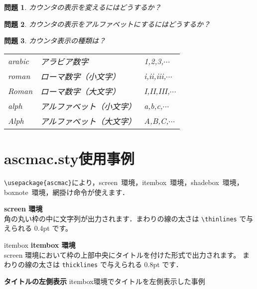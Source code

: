 \documentclass[a4paper,10pt]{jsarticle}
\begin{document}
\newtheorem{MONDAI}{問題}
\renewcommand{\theMONDAI}{\alph{MONDAI}}
\begin{MONDAI}
カウンタの表示を変えるにはどうするか？
\end{MONDAI}
\begin{MONDAI}
カウンタの表示をアルファベットにするにはどうするか？
\end{MONDAI}
\begin{MONDAI}
カウンタ表示の種類は？
\begin{center}
\begin{tabular}{lll}\hline
arabic & アラビア数字            & 1,2,3,$\cdots$    \\
roman  & ローマ数字（小文字）    & i,ii,iii,$\cdots$ \\
Roman  & ローマ数字（大文字）    & I,II,III,$\cdots$ \\
alph   & アルファベット（小文字）& a,b,c,$\cdots$    \\
Alph   & アルファベット（大文字）& A,B,C,$\cdots$    \\ \hline
\end{tabular}
\end{center}
\end{MONDAI}


\pagebreak
\section{ascmac.sty使用事例}
\verb|\usepackage{ascmac}|により，screen~環境，itembox~環境，shadebox~環境，boxnote~環境，網掛け命令が使えます．
\begin{center}
\begin{screen}
{\bfseries\large screen 環境}\\
角の丸い枠の中に文字列が出力されます．まわりの線の太さは \verb+\thinlines+ で与えられる 0.4pt です。
\end{screen}
\end{center}

\begin{itembox}{\Large {itembox}}
{\bfseries\large itembox 環境}\\
screen 環境において枠の上部中央にタイトルを付けた形式で出力されます。 まわりの線の太さは \verb+thicklines+ で与えられる 0.8pt です．
\end{itembox}

\begin{itembox}[l]{\bfseries タイトルの左側表示}
itembox環境でタイトルを左側表示した事例
\end{itembox}
\end{document}
